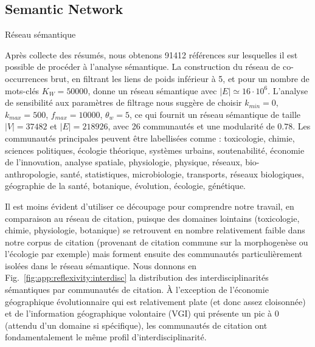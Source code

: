 \subsection{Semantic Network}{Réseau sémantique}


Après collecte des résumés, nous obtenons 91412 références sur lesquelles il est possible de procéder à l'analyse sémantique. La construction du réseau de co-occurrences brut, en filtrant les liens de poids inférieur à 5, et pour un nombre de mots-clés $K_W = 50000$, donne un réseau sémantique avec $\left|E\right|\simeq 16\cdot 10^6$. L'analyse de sensibilité aux paramètres de filtrage nous suggère de choisir $k_{min} = 0$, $k_{max}=500$, $f_{max} = 10000$, $\theta_w = 5$, ce qui fournit un réseau sémantique de taille $\left|V\right| = 37482$ et $\left|E\right| = 218926$, avec 26 communautés et une modularité de $0.78$. Les communautés principales peuvent être labellisées comme : toxicologie, chimie, sciences politiques, écologie théorique, systèmes urbains, soutenabilité, économie de l'innovation, analyse spatiale, physiologie, physique, réseaux, bio-anthropologie, santé, statistiques, microbiologie, transports, réseaux biologiques, géographie de la santé, botanique, évolution, écologie, génétique.


Il est moins évident d'utiliser ce découpage pour comprendre notre travail, en comparaison au réseau de citation, puisque des domaines lointains (toxicologie, chimie, physiologie, botanique) se retrouvent en nombre relativement faible dans notre corpus de citation (provenant de citation commune sur la morphogenèse ou l'écologie par exemple) mais forment ensuite des communautés particulièrement isolées dans le réseau sémantique. Nous donnons en Fig.~\ref{fig:app:reflexivity:interdisc} la distribution des interdisciplinarités sémantiques par communautés de citation. À l'exception de l'économie géographique évolutionnaire qui est relativement plate (et donc assez cloisonnée) et de l'information géographique volontaire (VGI) qui présente un pic à 0 (attendu d'un domaine si spécifique), les communautés de citation ont fondamentalement le même profil d'interdisciplinarité.


